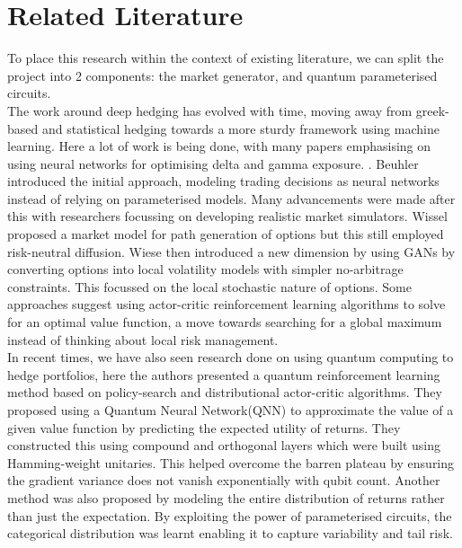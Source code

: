 \documentclass[12pt]{article}
\numberwithin{equation}{section}
\begin{document}
\section{Related Literature}
To place this research within the context of existing literature, we can split 
the project into 2 components: the market generator, and quantum parameterised circuits.
\\
The work around deep hedging has evolved with time, moving away from 
greek-based and statistical hedging towards a more sturdy framework using machine 
learning. Here a lot of work is being done, with many papers emphasising 
on using neural networks for optimising delta and gamma exposure.
\autocite{Enhancing BS delta, Deep Gamma Hedging}.
Beuhler introduced the initial approach, modeling trading decisions 
as neural networks instead of relying on parameterised models.
\autocite{Beuhler Deep Hedging} Many advancements were made after this with 
researchers focussing on developing realistic market simulators. Wissel 
proposed a market model for path generation of options but this still 
employed risk-neutral diffusion. Wiese then introduced 
a new dimension by using GANs by converting options into 
local volatility models with simpler no-arbitrage constraints. This focussed 
on the local stochastic nature of options. 
\autocite{Learning to simulate equity markets}
Some approaches suggest using actor-critic reinforcement learning algorithms to 
solve for an optimal value function, a move towards searching for a global
maximum instead of thinking about local risk management.\autocite{deep bellman}
\\
In recent times, we have also seen research done on using quantum computing to 
hedge portfolios, here the authors presented a quantum reinforcement learning 
method based on policy-search and distributional actor-critic algorithms. 
They proposed using a Quantum Neural Network(QNN) to approximate the value of a 
given value function by predicting the expected utility of returns. They constructed 
this using compound and orthogonal layers which were built using Hamming-weight
unitaries. This helped overcome the barren plateau by ensuring the gradient 
variance does not vanish exponentially with qubit count. Another method was also 
proposed by modeling the entire distribution of returns rather than just the 
expectation. By exploiting the power of parameterised circuits, the categorical 
distribution was learnt enabling it to capture variability and tail risk. 
\autocite{quantum deep hedging}
\\
\end{document}
